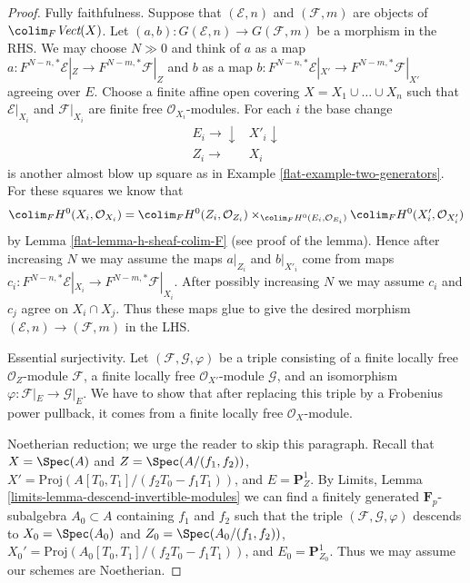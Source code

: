 \begin{proof}

Fully faithfulness. Suppose that $(\mathcal{E}, n)$ and
$(\mathcal{F}, m)$ are objects of $\colim_F \textit{Vect}(X)$.
Let $(a, b) : G(\mathcal{E}, n) \to G(\mathcal{F}, m)$
be a morphism in the RHS. We may choose $N \gg 0$ and
think of $a$ as a map
$a : F^{N - n, *}\mathcal{E}|_Z \to F^{N - m, *}\mathcal{F}|_Z$
and $b$ as a map
$b : F^{N - n, *}\mathcal{E}|_{X'} \to F^{N - m, *}\mathcal{F}|_{X'}$
agreeing over $E$.
Choose a finite affine open covering
$X = X_1 \cup \ldots \cup X_n$ such that $\mathcal{E}|_{X_i}$
and $\mathcal{F}|_{X_i}$ are finite free $\mathcal{O}_{X_i}$-modules.
For each $i$ the base change
$$
\begin{array}{cc}E_i \longrightarrow\downarrow & X'_i \downarrow \\ Z_i \longrightarrow & X_i\end{array}
$$
is another almost blow up square as in Example \ref{flat-example-two-generators}.
For these squares we know that
$$
\colim_F H^0(X_i, \mathcal{O}_{X_i}) =
\colim_F H^0(Z_i, \mathcal{O}_{Z_i})
\times_{\colim_F H^0(E_i, \mathcal{O}_{E_i})}
\colim_F H^0(X'_i, \mathcal{O}_{X'_i})
$$
by Lemma \ref{flat-lemma-h-sheaf-colim-F} (see proof of the lemma).
Hence after increasing $N$ we may assume
the maps $a|_{Z_i}$ and $b|_{X'_i}$ come from
maps $c_i : F^{N - n, *}\mathcal{E}|_{X_i} \to F^{N - m, *}\mathcal{F}|_{X_i}$.
After possibly increasing $N$ we may assume $c_i$ and $c_j$
agree on $X_i \cap X_j$. Thus these maps glue to give the
desired morphism $(\mathcal{E}, n) \to (\mathcal{F}, m)$
in the LHS.

\medskip\noindent
Essential surjectivity. Let $(\mathcal{F}, \mathcal{G}, \varphi)$ be a
triple consisting of
a finite locally free $\mathcal{O}_Z$-module $\mathcal{F}$,
a finite locally free $\mathcal{O}_{X'}$-module $\mathcal{G}$, and
an isomorphism $\varphi : \mathcal{F}|_E \to \mathcal{G}|_E$.
We have to show that after replacing this triple by a Frobenius
power pullback, it comes from a finite locally free $\mathcal{O}_X$-module.

\medskip\noindent
Noetherian reduction; we urge the reader to skip this paragraph.
Recall that $X = \Spec(A)$ and $Z = \Spec(A/(f_1, f_2))$,
$X' = \text{Proj}(A[T_0, T_1]/(f_2T_0 - f_1T_1))$, and
$E = \mathbf{P}^1_Z$. By Limits, Lemma
\ref{limits-lemma-descend-invertible-modules}
we can find a finitely generated $\mathbf{F}_p$-subalgebra
$A_0 \subset A$ containing $f_1$ and $f_2$ such that the triple
$(\mathcal{F}, \mathcal{G}, \varphi)$ descends to
$X_0 = \Spec(A_0)$ and $Z_0 = \Spec(A_0/(f_1, f_2))$,
$X_0' = \text{Proj}(A_0[T_0, T_1]/(f_2T_0 - f_1T_1))$, and
$E_0 = \mathbf{P}^1_{Z_0}$. Thus we may assume our schemes
are Noetherian.


\end{proof}
